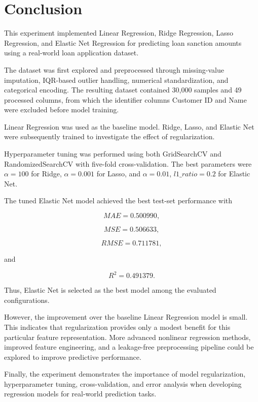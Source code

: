 \documentclass[12pt,a4paper]{article}
\begin{document}

\section{Conclusion}

This experiment implemented Linear Regression, Ridge Regression, Lasso
Regression, and Elastic Net Regression for predicting loan sanction
amounts using a real-world loan application dataset.

The dataset was first explored and preprocessed through missing-value
imputation, IQR-based outlier handling, numerical standardization, and
categorical encoding. The resulting dataset contained 30,000 samples and
49 processed columns, from which the identifier columns Customer ID and
Name were excluded before model training.

Linear Regression was used as the baseline model. Ridge, Lasso, and
Elastic Net were subsequently trained to investigate the effect of
regularization.

Hyperparameter tuning was performed using both GridSearchCV and
RandomizedSearchCV with five-fold cross-validation. The best parameters
were $\alpha=100$ for Ridge, $\alpha=0.001$ for Lasso, and
$\alpha=0.01$, $l1\_ratio=0.2$ for Elastic Net.

The tuned Elastic Net model achieved the best test-set performance with

\[
MAE=0.500990,
\]

\[
MSE=0.506633,
\]

\[
RMSE=0.711781,
\]

and

\[
R^2=0.491379.
\]

Thus, Elastic Net is selected as the best model among the evaluated
configurations.

However, the improvement over the baseline Linear Regression model is
small. This indicates that regularization provides only a modest benefit
for this particular feature representation. More advanced nonlinear
regression methods, improved feature engineering, and a leakage-free
preprocessing pipeline could be explored to improve predictive
performance.

Finally, the experiment demonstrates the importance of model
regularization, hyperparameter tuning, cross-validation, and error
analysis when developing regression models for real-world prediction
tasks.
\end{document}
